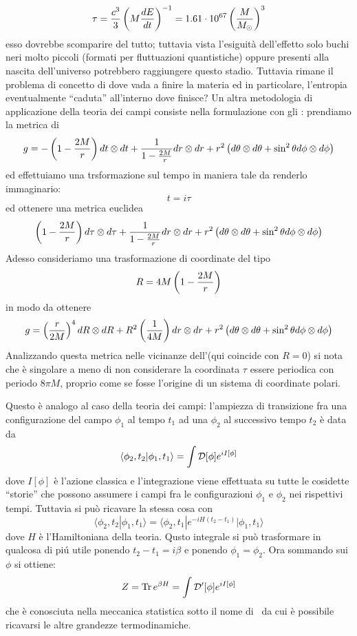 $$
\tau={c^3\over 3}\left(M{dE\over dt}\right)^{-1}=1.61\cdot 10^{67}\left(M\over M_\odot\right)^3
$$
esso dovrebbe scomparire del tutto; tuttavia vista l'esiguit\`a dell'effetto solo buchi neri molto piccoli (formati per fluttuazioni quantistiche) oppure presenti alla nascita dell'universo potrebbero raggiungere questo stadio. Tuttavia rimane il problema di concetto di dove vada a finire la materia ed in particolare, l'entropia eventualmente ``caduta'' all'interno dove finisce?
%
%
%
Un altra metodologia di applicazione della teoria dei campi consiste nella formulazione con gli : prendiamo la metrica di \Sch
$$
g=-\left(1-{2M\over r}\right)dt\otimes dt+{1\over 1-{2M\over r}}dr\otimes dr+r^2\left(d\theta\otimes d\theta+\sin^2\theta d\phi\otimes d\phi\right)
$$
ed effettuiamo una trsformazione sul tempo in maniera tale da renderlo immaginario:
$$
t=i\tau
$$
ed ottenere una metrica euclidea
$$
\left(1-{2M\over r}\right)d\tau\otimes d\tau+{1\over1-{2M\over r}}dr\otimes dr+r^2\left(d\theta\otimes d\theta+\sin^2\theta d\phi\otimes d\phi\right)
$$ 
Adesso consideriamo una trasformazione di coordinate del tipo
$$
R=4M\left(1-{2M\over r}\right)
$$
in modo da ottenere
$$
g=\left(r\over2M\right)^4dR\otimes dR+R^2\left(1\over4M\right)dr\otimes dr+r^2\left(d\theta\otimes d\theta+\sin^2\theta d\phi\otimes d\phi\right)
$$
Analizzando questa metrica nelle vicinanze dell'\Oe (qui coincide con $R=0$) si nota che \`e singolare a meno di non considerare la coordinata $\tau$ essere periodica con periodo $8\pi M$, proprio come se fosse l'origine di un sistema di coordinate polari.\par
Questo \`e analogo al caso della teoria dei campi: l'ampiezza di transizione fra una configurazione del campo $\phi_1$ al tempo $t_1$ ad una $\phi_2$ al successivo tempo $t_2$ \`e data da
$$
\langle\phi_2,t_2|\phi_1,t_1\rangle=\int{\cal D}[\phi]e^{iI[\phi]}
$$
dove $I[\phi]$ \`e l'azione classica e l'integrazione viene effettuata su tutte le cosidette ``storie'' che possono assumere i campi fra le configurazioni $\phi_1$ e $\phi_2$ nei rispettivi tempi. Tuttavia si pu\`o ricavare la stessa cosa con 
$$
\langle\phi_2,t_2|\phi_1,t_1\rangle=\langle\phi_2,t_1|e^{-iH(t_2-t_1)}|\phi_1,t_1\rangle
$$
dove $H$ \`e l'Hamiltoniana della teoria. Qusto integrale si pu\`o trasformare in qualcosa di pi\'u utile ponendo $t_2-t_1=i\beta$ e ponendo $\phi_1=\phi_2$. Ora sommando sui $\phi$ si ottiene:
$$
Z=\hbox{Tr}\,e^{\beta H}=\int{\cal D}^\prime[\phi]e^{iI[\phi]}
$$
che \`e conosciuta nella meccanica statistica sotto il nome di \ da cui \`e possibile ricavarsi le altre grandezze termodinamiche.\par
